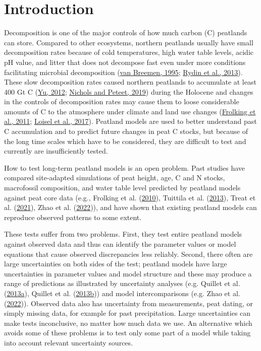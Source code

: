 \documentclass[
  12pt,
]{article}
\begin{document}
\hypertarget{introduction}{%
\section{Introduction}\label{introduction}}

Decomposition is one of the major controls of how much carbon (C) peatlands can store. Compared to other ecosystems, northern peatlands usually have small decomposition rates because of cold temperatures, high water table levels, acidic pH value, and litter that does not decompose fast even under more conditions facilitating microbial decomposition (\protect\hyperlink{ref-vanBreemen.1995}{van Breemen, 1995}; \protect\hyperlink{ref-Rydin.2013}{Rydin et al., 2013}). These slow decomposition rates caused northern peatlands to accumulate at least 400 Gt C (\protect\hyperlink{ref-Yu.2012}{Yu, 2012}; \protect\hyperlink{ref-Nichols.2019}{Nichols and Peteet, 2019}) during the Holocene and changes in the controls of decomposition rates may cause them to loose considerable amounts of C to the atmosphere under climate and land use changes (\protect\hyperlink{ref-Frolking.2011}{Frolking et al., 2011}; \protect\hyperlink{ref-Loisel.2017}{Loisel et al., 2017}). Peatland models are used to better understand past C accumulation and to predict future changes in peat C stocks, but because of the long time scales which have to be considered, they are difficult to test and currently are insufficiently tested.

How to test long-term peatland models is an open problem. Past studies have compared site-adapted simulations of peat height, age, C and N stocks, macrofossil composition, and water table level predicted by peatland models against peat core data (e.g., Frolking et al. (\protect\hyperlink{ref-Frolking.2010}{2010}), Tuittila et al. (\protect\hyperlink{ref-Tuittila.2013}{2013}), Treat et al. (\protect\hyperlink{ref-Treat.2021}{2021}), Zhao et al. (\protect\hyperlink{ref-Zhao.2022}{2022})), and have shown that existing peatland models can reproduce observed patterns to some extent.

These tests suffer from two problems. First, they test entire peatland models against observed data and thus can identify the parameter values or model equations that cause observed discrepancies less reliably. Second, there often are large uncertainties on both sides of the test; peatland models have large uncertainties in parameter values and model structure and these may produce a range of predictions as illustrated by uncertainty analyses (e.g. Quillet et al. (\protect\hyperlink{ref-Quillet.2013}{2013a}), Quillet et al. (\protect\hyperlink{ref-Quillet.2013a}{2013b})) and model intercomparisons (e.g. Zhao et al. (\protect\hyperlink{ref-Zhao.2022}{2022})). Observed data also has uncertainty from measurements, peat dating, or simply missing data, for example for past precipitation. Large uncertainties can make tests inconclusive, no matter how much data we use. An alternative which avoids some of these problems is to test only some part of a model while taking into account relevant uncertainty sources.
\end{document}

